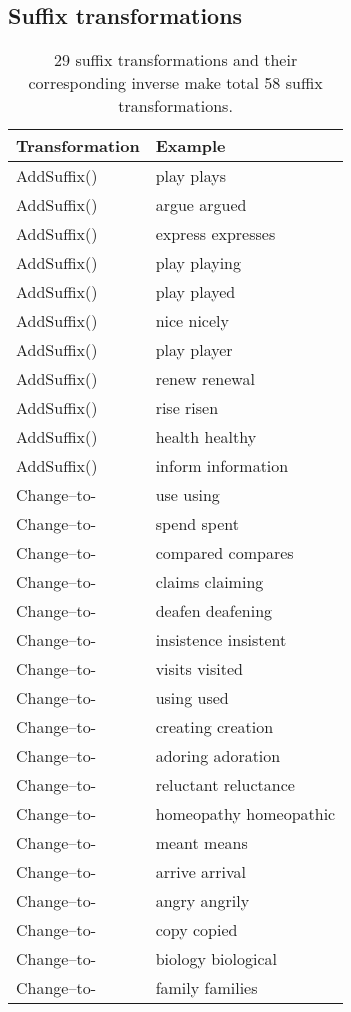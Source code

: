 \documentclass[11pt,a4paper]{article}
\newcommand{\addsuffix}{\mbox{\sc AddSuffix}}
\newcommand{\transform}[2]{\sc Change-#1-to-#2}
\begin{document}
\subsection{Suffix transformations}

\begin{table}[h]
    \centering
    \begin{small}
    \begin{tabular}{|l|l|} \hline
Transformation & Example \\ \hline
\addsuffix() &  play  plays \\
\addsuffix() &  argue  argued \\ 
\addsuffix() &  express  expresses \\
\addsuffix() &  play  playing \\
\addsuffix() &  play  played\\
\addsuffix() &  nice  nicely \\
\addsuffix() &  play  player\\
\addsuffix() &  renew  renewal \\
\addsuffix() &  rise  risen \\ 
\addsuffix() &  health  healthy  \\
        \addsuffix() &  inform  information  \\
\transform{}{} &  use  using \\
\transform{}{} &  spend  spent\\ 
\transform{}{} &  
        compared  compares\\
\transform{}{} &  claims   claiming \\
\transform{}{} &  deafen  deafening \\
\transform{}{} &  insistence  insistent \\
        \transform{}{} &  visits  visited \\
        \transform{}{} &  using  used \\
        \transform{}{} &  creating  creation \\
        \transform{}{} &  adoring  adoration \\
        \transform{}{} &  reluctant  reluctance \\
        \transform{}{} &  homeopathy  homeopathic \\
        \transform{}{} &  meant  means \\
        \transform{}{} &  arrive  arrival \\
        \transform{}{} &  angry  angrily \\
        \transform{}{} &  copy  copied \\
        \transform{}{} &  biology  biological \\
        \transform{}{} &  family  families \\\hline
    \end{tabular}
    \caption{29 suffix transformations and their corresponding inverse make total 58 suffix transformations. }
    \label{tab:suffix_transforms}
     \end{small}
\end{table}{}
\end{document}
